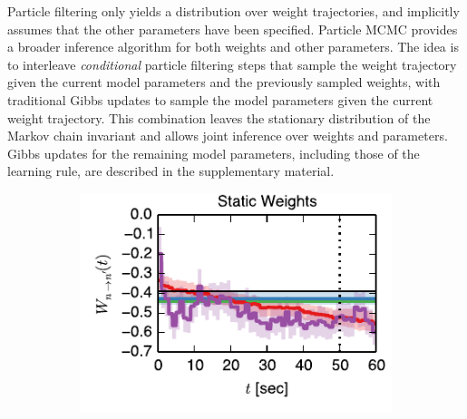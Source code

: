 Particle filtering only yields a distribution over weight
trajectories, and implicitly assumes that the other parameters have
been specified. Particle MCMC provides a broader inference algorithm
for both weights and other parameters. The idea is to interleave
\emph{conditional} particle filtering steps that sample the weight
trajectory given the current model parameters and the previously
sampled weights, with traditional Gibbs updates to sample the model
parameters given the current weight trajectory. This combination
leaves the stationary distribution of the Markov chain invariant and
allows joint inference over weights and parameters.  Gibbs updates for
the remaining model parameters, including those of the learning rule,
are described in the supplementary material.

\begin{figure}[t!]
  \centering
  \vspace{-0.5em}
  \begin{subfigure}[T]{2.4in}
    \includegraphics[width=\textwidth]{figures/ch4/fig3_static_trajectory}    
    \label{fig:fig3_static_trajectory}
  \end{subfigure}
  \begin{subfigure}[T]{1.45in}

\end{subfigure}
\end{figure}
